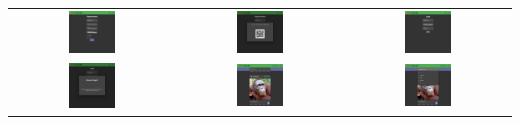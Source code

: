 \phantom{M}
\begin{tabular}{ccc}
	\includegraphics[width=0.3\textwidth]{assets/img/screenshots/1-registrazione.png} &
	\includegraphics[width=0.3\textwidth]{assets/img/screenshots/2-qrcode.png} &
	\includegraphics[width=0.3\textwidth]{assets/img/screenshots/3-login.png} \\
	\includegraphics[width=0.3\textwidth]{assets/img/screenshots/4-errore_login.png} &
	\includegraphics[width=0.3\textwidth]{assets/img/screenshots/5-homepage.png} &
	\includegraphics[width=0.3\textwidth]{assets/img/screenshots/6-tags.png}\\

\end{tabular}
